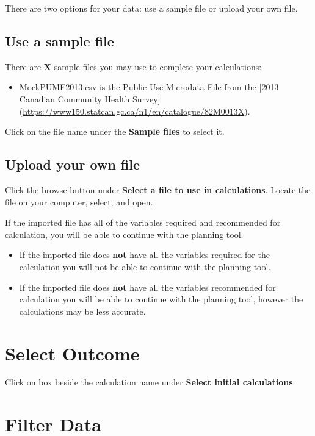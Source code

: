 \documentclass[]{book}
\providecommand{\tightlist}{%
  \setlength{\itemsep}{0pt}\setlength{\parskip}{0pt}}
\begin{document}
There are two options for your data: use a sample file or upload your
own file.

\subsection{Use a sample file}\label{use-a-sample-file}

There are \textbf{X} sample files you may use to complete your
calculations:

\begin{itemize}
\tightlist
\item
  MockPUMF2013.csv is the Public Use Microdata File from the {[}2013
  Canadian Community Health Survey{]}
  (\url{https://www150.statcan.gc.ca/n1/en/catalogue/82M0013X}).
\end{itemize}

Click on the file name under the \textbf{Sample files} to select it.

\subsection{Upload your own file}\label{upload-your-own-file}

Click the browse button under \textbf{Select a file to use in
calculations}. Locate the file on your computer, select, and open.

If the imported file has all of the variables required and recommended
for calculation, you will be able to continue with the planning tool.

\begin{itemize}
\item
  If the imported file does \textbf{not} have all the variables required
  for the calculation you will not be able to continue with the planning
  tool.
\item
  If the imported file does \textbf{not} have all the variables
  recommended for calculation you will be able to continue with the
  planning tool, however the calculations may be less accurate.
\end{itemize}

\section{Select Outcome}\label{select-outcome}

Click on box beside the calculation name under \textbf{Select initial
calculations}.

\section{Filter Data}\label{filter-data}
\end{document}
